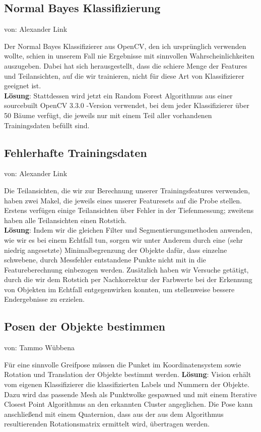 \documentclass{suturo}
\makeatletter
\newcommand{\chapterauthor}[1]{%
  {\parindent0pt\vspace*{-27pt}%
  \linespread{0}\small\begin{flushright}von: #1\end{flushright}%
  \par\nobreak\vspace*{0pt}}
  \@afterheading%
}
\makeatother
\begin{document}
\subsection{Normal Bayes Klassifizierung}
\chapterauthor{Alexander Link}
Der Normal Bayes Klassifizierer aus OpenCV, den ich ursprünglich verwenden wollte, schien in unserem Fall nie Ergebnisse mit sinnvollen Wahrscheinlichkeiten auszugeben. Dabei hat sich herausgestellt, dass die schiere Menge der Features und Teilansichten, auf die wir trainieren, nicht für diese Art von Klassifizierer geeignet ist. \\
\textbf{Lösung}: Stattdessen wird jetzt ein Random Forest Algorithmus aus einer sourcebuilt OpenCV 3.3.0 -Version verwendet, bei dem jeder Klassifizierer über 50 Bäume verfügt, die jeweils nur mit einem Teil aller vorhandenen Trainingsdaten befüllt sind.

\subsection{Fehlerhafte Trainingsdaten}
\chapterauthor{Alexander Link}
Die Teilansichten, die wir zur Berechnung unserer Trainingsfeatures verwenden, haben zwei Makel, die jeweils eines unserer Featuresets auf die Probe stellen. Erstens verfügen einige Teilansichten über Fehler in der Tiefenmessung; zweitens haben alle Teilansichten einen Rotstich. \\
\textbf{Lösung}: Indem wir die gleichen Filter und Segmentierungsmethoden anwenden, wie wir es bei einem Echtfall tun, sorgen wir unter Anderem durch eine (sehr niedrig angesetzte) Minimalbegrenzung der Objekte dafür, dass einzelne schwebene, durch Messfehler entstandene Punkte nicht mit in die Featureberechnung einbezogen werden. Zusätzlich haben wir Versuche getätigt, durch die wir dem Rotstich per Nachkorrektur der Farbwerte bei der Erkennung von Objekten im Echtfall entgegenwirken konnten, um stellenweise bessere Endergebnisse zu erzielen.

\subsection{Posen der Objekte bestimmen}
\chapterauthor{Tammo Wübbena}
Für eine sinnvolle Greifpose müssen die Punket im Koordinatensystem sowie Rotation und Translation der Objekte bestimmt werden. 
\textbf{Lösung}: Vision erhält vom eigenen Klassifizierer die klassifizierten Labels und Nummern der Objekte. Dazu wird das passende Mesh als Punktwolke gespawned und mit einem Iterative Closest Point Algorithmus an den erkannten Cluster angeglichen. Die Pose kann anschließend mit einem Quaternion, dass aus der aus dem Algorithmus resultierenden Rotationsmatrix ermittelt wird, übertragen werden.
\end{document}
